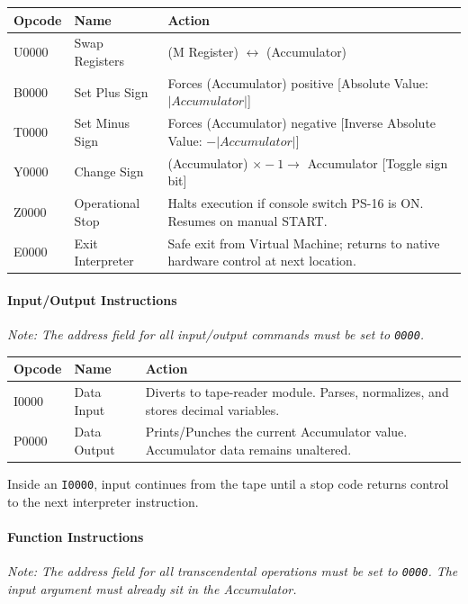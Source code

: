 \begin{table}[h]
\centering
\small
\ttfamily
\begin{tabularx}{\textwidth}{llX}
\toprule
\textbf{Opcode} & \textbf{Name} & \textbf{Action} \\ 
\midrule
U0000 & Swap Registers & (M Register) $\longleftrightarrow$ (Accumulator) \\
B0000 & Set Plus Sign & Forces (Accumulator) positive \hfill [Absolute Value: $|Accumulator|$] \\
T0000 & Set Minus Sign & Forces (Accumulator) negative \hfill [Inverse Absolute Value: $-|Accumulator|$] \\
Y0000 & Change Sign & (Accumulator) $\times -1 \rightarrow$ Accumulator \hfill [Toggle sign bit] \\
Z0000 & Operational Stop & Halts execution if console switch \textsf{PS-16} is \textsf{ON}. Resumes on manual \textsf{START}. \\
E0000 & Exit Interpreter & Safe exit from Virtual Machine; returns to native hardware control at next location. \\
\bottomrule
\end{tabularx}
\end{table}

\paragraph{Input/Output Instructions}
\textit{Note: The address field for all input/output commands must be set to \texttt{0000}.}

\begin{table}[h]
\centering
\small
\ttfamily
\begin{tabularx}{\textwidth}{llX}
\toprule
\textbf{Opcode} & \textbf{Name} & \textbf{Action} \\ 
\midrule
I0000 & Data Input & Diverts to tape-reader module. Parses, normalizes, and stores decimal variables. \\
P0000 & Data Output & Prints/Punches the current Accumulator value. Accumulator data remains unaltered. \\
\bottomrule
\end{tabularx}
\end{table}

Inside an \texttt{I0000}, input continues from the tape until a stop code returns control to the next interpreter instruction.

\paragraph{Function Instructions}
\textit{Note: The address field for all transcendental operations must be set to \texttt{0000}. The input argument must already sit in the Accumulator.}

